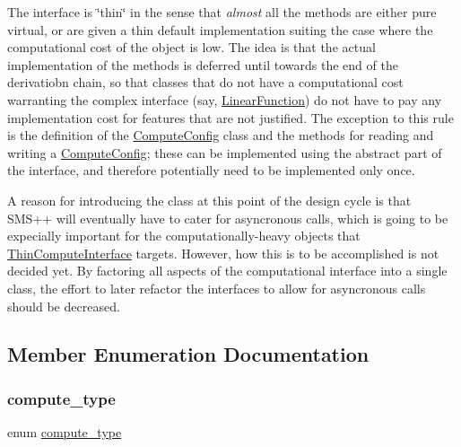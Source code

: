 The interface is \char`\"{}thin\char`\"{} in the sense that {\itshape almost} all the methods are either pure virtual, or are given a thin default implementation suiting the case where the computational cost of the object is low. The idea is that the actual implementation of the methods is deferred until towards the end of the derivatiobn chain, so that classes that do not have a computational cost warranting the complex interface (say, \mbox{\hyperlink{class_s_m_spp__di__unipi__it_1_1_linear_function}{Linear\+Function}}) do not have to pay any implementation cost for features that are not justified. The exception to this rule is the definition of the \mbox{\hyperlink{class_s_m_spp__di__unipi__it_1_1_compute_config}{Compute\+Config}} class and the methods for reading and writing a \mbox{\hyperlink{class_s_m_spp__di__unipi__it_1_1_compute_config}{Compute\+Config}}; these can be implemented using the abstract part of the interface, and therefore potentially need to be implemented only once.

A reason for introducing the class at this point of the design cycle is that S\+M\+S++ will eventually have to cater for asyncronous calls, which is going to be expecially important for the computationally-\/heavy objects that \mbox{\hyperlink{class_s_m_spp__di__unipi__it_1_1_thin_compute_interface}{Thin\+Compute\+Interface}} targets. However, how this is to be accomplished is not decided yet. By factoring all aspects of the computational interface into a single class, the effort to later refactor the interfaces to allow for asyncronous calls should be decreased. 

\subsection{Member Enumeration Documentation}
\mbox{\label{class_s_m_spp__di__unipi__it_1_1_thin_compute_interface_af53bf2e56537fb2e10afe53b17ba1080}} 
\subsubsection{\texorpdfstring{compute\+\_\+type}{compute\_type}}
{\footnotesize\ttfamily enum \mbox{\hyperlink{class_s_m_spp__di__unipi__it_1_1_thin_compute_interface_af53bf2e56537fb2e10afe53b17ba1080}{compute\+\_\+type}}}



